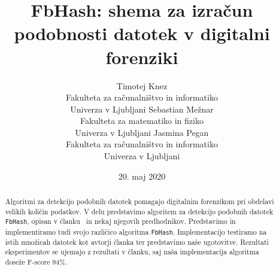 \documentclass{acm_proc_article-sp}
\begin{document}
\title{FbHash: shema za izračun podobnosti datotek v digitalni forenziki}

\author{
\alignauthor
Timotej Knez \\
Fakulteta za računalništvo in informatiko \\
Univerza v Ljubljani%
\alignauthor
Sebastian Mežnar\\
Fakulteta za matematiko in fiziko \\
Univerza v Ljubljani%
\alignauthor 
Jasmina Pegan \\
Fakulteta za računalništvo in informatiko \\
Univerza v Ljubljani%
}

\date{20. maj 2020}

\maketitle
\begin{abstract}
Algoritmi za detekcijo podobnih datotek pomagajo digitalnim forenzikom pri obdelavi velikih količin podatkov. V delu predstavimo algoritem za detekcijo podobnih datotek \texttt{FbHash}, opisan v članku~\cite{fbhash} in nekaj njegovih predhodnikov. Predstavimo in implementiramo tudi svojo različico algoritma \texttt{FbHash}. Implementacijo testiramo na istih množicah datotek kot avtorji članka ter predstavimo naše ugotovitve.
Rezultati eksperimentov se ujemajo z rezultati v članku, saj naša implementacija algoritma doseže F-score 94\%.
\end{abstract}
\end{document}
